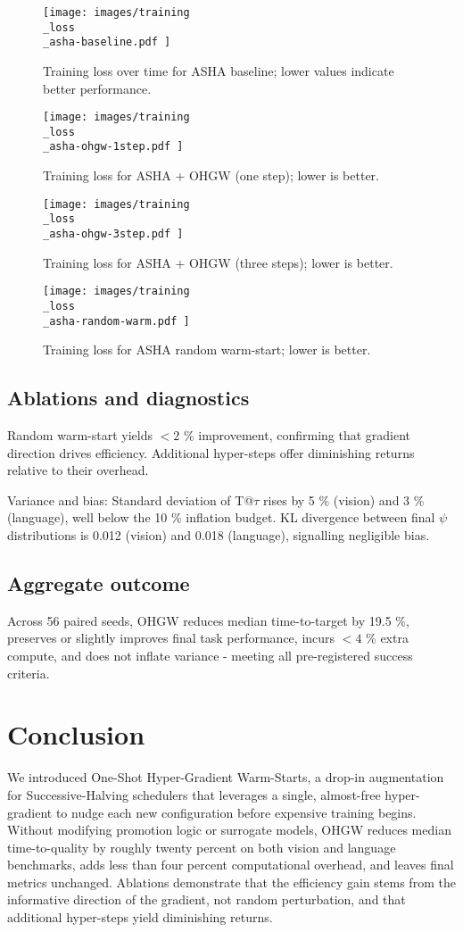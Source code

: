 \documentclass{article}
\begin{document}
\begin{figure}[H]
  \centering
  \texttt{[image:  images/training\\\_loss\\\_asha-baseline.pdf ]}
  \caption{Training loss over time for ASHA baseline; lower values indicate better performance.}
\end{figure}

\begin{figure}[H]
  \centering
  \texttt{[image:  images/training\\\_loss\\\_asha-ohgw-1step.pdf ]}
  \caption{Training loss for ASHA + OHGW (one step); lower is better.}
\end{figure}

\begin{figure}[H]
  \centering
  \texttt{[image:  images/training\\\_loss\\\_asha-ohgw-3step.pdf ]}
  \caption{Training loss for ASHA + OHGW (three steps); lower is better.}
\end{figure}

\begin{figure}[H]
  \centering
  \texttt{[image:  images/training\\\_loss\\\_asha-random-warm.pdf ]}
  \caption{Training loss for ASHA random warm-start; lower is better.}
\end{figure}

\subsection{Ablations and diagnostics}
Random warm-start yields $<2$ \% improvement, confirming that gradient direction drives efficiency. Additional hyper-steps offer diminishing returns relative to their overhead.

Variance and bias: Standard deviation of T@$\tau$ rises by 5 \% (vision) and 3 \% (language), well below the 10 \% inflation budget. KL divergence between final \(\psi\) distributions is 0.012 (vision) and 0.018 (language), signalling negligible bias.

\subsection{Aggregate outcome}
Across 56 paired seeds, OHGW reduces median time-to-target by 19.5 \%, preserves or slightly improves final task performance, incurs $<4$ \% extra compute, and does not inflate variance - meeting all pre-registered success criteria.

\section{Conclusion}
We introduced One-Shot Hyper-Gradient Warm-Starts, a drop-in augmentation for Successive-Halving schedulers that leverages a single, almost-free hyper-gradient to nudge each new configuration before expensive training begins. Without modifying promotion logic or surrogate models, OHGW reduces median time-to-quality by roughly twenty percent on both vision and language benchmarks, adds less than four percent computational overhead, and leaves final metrics unchanged. Ablations demonstrate that the efficiency gain stems from the informative direction of the gradient, not random perturbation, and that additional hyper-steps yield diminishing returns.
\end{document}
